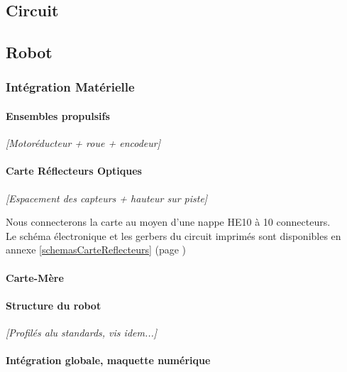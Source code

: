  \subsection{Circuit}


\subsection{Robot}

	\subsubsection{Intégration Matérielle}

		\paragraph{Ensembles propulsifs}

			\textit{[Motoréducteur + roue + encodeur]}

		\paragraph{Carte Réflecteurs Optiques}\label{integrationReflecteurs}



			\textit{[Espacement des capteurs + hauteur sur piste]}




			Nous connecterons la carte au moyen d'une nappe HE10 à 10 connecteurs.\\

			Le schéma électronique et les gerbers du circuit imprimés sont disponibles en annexe \ref{schemasCarteReflecteurs} (page \pageref{schemasCarteReflecteurs})

		\paragraph{Carte-Mère}\label{carteMere}


		\paragraph{Structure du robot}


			\textit{[Profilés alu standards, vis idem...]}


		\paragraph{Intégration globale, maquette numérique}

